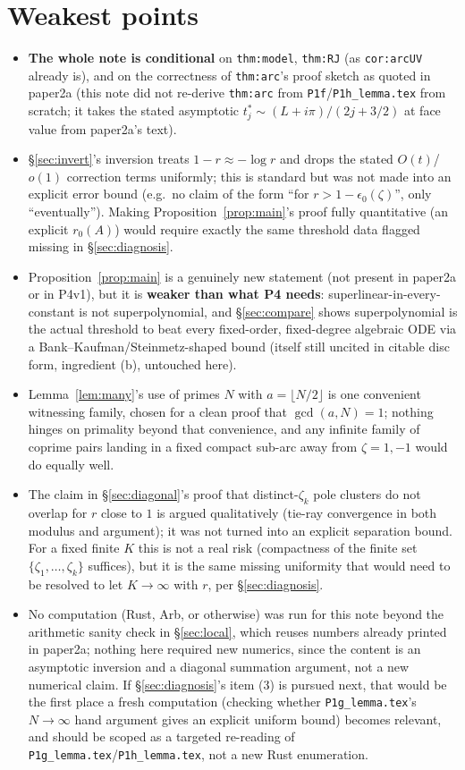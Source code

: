\documentclass[11pt]{article}
\theoremstyle{remark}
\begin{document}
\section*{Weakest points}
\begin{itemize}
\item \textbf{The whole note is conditional} on \texttt{thm:model}, \texttt{thm:RJ} (as
\texttt{cor:arcUV} already is), and on the correctness of \texttt{thm:arc}'s proof sketch as quoted
in paper2a (this note did not re-derive \texttt{thm:arc} from \texttt{P1f}/\texttt{P1h\_lemma.tex}
from scratch; it takes the stated asymptotic $t^\ast_j\sim(L+i\pi)/(2j+3/2)$ at face value from
paper2a's text).
\item \S\ref{sec:invert}'s inversion treats $1-r\approx-\log r$ and drops the stated $O(t)$/$o(1)$
correction terms uniformly; this is standard but was not made into an explicit error bound (e.g.\ no
claim of the form ``for $r>1-\epsilon_0(\zeta)$'', only ``eventually''). Making
Proposition~\ref{prop:main}'s proof fully quantitative (an explicit $r_0(A)$) would require exactly
the same threshold data flagged missing in \S\ref{sec:diagnosis}.
\item Proposition~\ref{prop:main} is a genuinely new statement (not present in paper2a or in P4v1),
but it is \textbf{weaker than what P4 needs}: superlinear-in-every-constant is not superpolynomial,
and \S\ref{sec:compare} shows superpolynomial is the actual threshold to beat every fixed-order,
fixed-degree algebraic ODE via a Bank--Kaufman/Steinmetz-shaped bound (itself still uncited in
citable disc form, ingredient (b), untouched here).
\item Lemma~\ref{lem:many}'s use of primes $N$ with $a=\lfloor N/2\rfloor$ is one convenient
witnessing family, chosen for a clean proof that $\gcd(a,N)=1$; nothing hinges on primality beyond
that convenience, and any infinite family of coprime pairs landing in a fixed compact sub-arc away
from $\zeta=1,-1$ would do equally well.
\item The claim in \S\ref{sec:diagonal}'s proof that distinct-$\zeta_k$ pole clusters do not overlap
for $r$ close to $1$ is argued qualitatively (tie-ray convergence in both modulus and argument); it
was not turned into an explicit separation bound. For a fixed finite $K$ this is not a real risk
(compactness of the finite set $\{\zeta_1,\ldots,\zeta_k\}$ suffices), but it is the same missing
uniformity that would need to be resolved to let $K\to\infty$ with $r$, per \S\ref{sec:diagnosis}.
\item No computation (Rust, Arb, or otherwise) was run for this note beyond the arithmetic sanity
check in \S\ref{sec:local}, which reuses numbers already printed in paper2a; nothing here required
new numerics, since the content is an asymptotic inversion and a diagonal summation argument, not a
new numerical claim. If \S\ref{sec:diagnosis}'s item (3) is pursued next, that would be the first
place a fresh computation (checking whether \texttt{P1g\_lemma.tex}'s $N\to\infty$ hand argument
gives an explicit uniform bound) becomes relevant, and should be scoped as a targeted re-reading of
\texttt{P1g\_lemma.tex}/\texttt{P1h\_lemma.tex}, not a new Rust enumeration.
\end{itemize}
\end{document}
